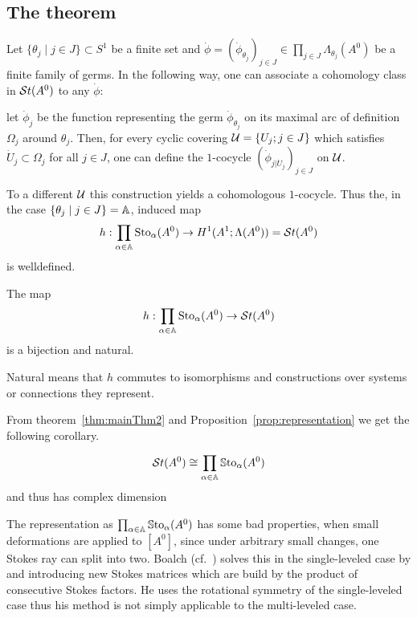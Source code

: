 \subsection{The theorem}
\begin{comment}
  \cite[Thm.6.3.1]{sibuya1990Linear} says: if two differential equations have
  the same stokes phenomenon, they are analytically equivalent.
\end{comment}
Let $\{\theta_j\mid j\in J\}\subset S^1$ be a finite set and
$\dot\phi=(\dot\phi_{\theta_j})_{j\in J}
\in\prod_{j\in J}\Lambda_{\theta_j}(A^0)$ be a finite family of germs.
In the following way, one can associate a cohomology class in $\mathcal{S}{}t(A^0)$ to any
$\dot\phi$:
\begin{einr}
  let $\dot\phi_j$ be the function representing the germ
  $\dot\phi_{\theta_j}$ on its maximal arc of definition $\Omega_j$ around
  $\theta_j$.
  Then, for every cyclic covering $\mathcal{U}=\{U_j;j\in J\}$ which satisfies
  $\dot U_j\subset \Omega_j$ for all $j\in J$, one can define the $1$-cocycle
  $(\dot\phi_{j|\dot U_j})_{j\in J}$ on $\mathcal{U}$.
\end{einr}
To a different $\mathcal{U}$ this construction yields a cohomologous
$1$-cocycle\TODO[Proof]. Thus the, in the case $\{\theta_j\mid j\in J\}=\mathbb{A}$,
induced map
\[
  h:\prod_{\alpha\in\mathbb{A}}\operatorname{Sto}_\alpha(A^0)\to
  H^1(A^1;\Lambda(A^0))=\mathcal{S}{}t(A^0)
\]
is welldefined.
\begin{tthm}
  \label{thm:mainThm2}
  The map
  \[
    h:\prod_{\alpha\in\mathbb{A}}\operatorname{Sto}_\alpha(A^0)\to\mathcal{S}{}t(A^0)
  \]
  is a bijection and natural.
  \begin{s-rem}
    Natural means that $h$ commutes to isomorphisms and constructions over
    systems or connections they represent.
    \begin{comment}
      See \cite{Loday1994} Section III.3.3
    \end{comment}
  \end{s-rem}
\end{tthm}
From theorem~\ref{thm:mainThm2} and Proposition~\ref{prop:representation} we
get the following corollary.
\begin{cor}
  \[
    \mathcal{S}{}t(A^0) \cong \prod_{\alpha\in\mathbb{A}}\operatorname{\mathbb{S}to}_\alpha(A^0)
  \]
  and thus has complex dimension \TODO{}
  \begin{s-rem}
    The representation as $\prod_{\alpha\in\mathbb{A}}\operatorname{\mathbb{S}to}_\alpha(A^0)$ has some bad
    properties, when small deformations are applied to $[A^0]$, since under
    arbitrary small changes, one Stokes ray can split into two. Boalch
    (cf.~\cite{boalch,thboalch}) solves this in the single-leveled case by
     and introducing new
    Stokes matrices which are build by the product of consecutive Stokes
    factors. He uses the rotational symmetry of the single-leveled case thus
    his method is not simply applicable to the multi-leveled case.
  \end{s-rem}
\end{cor}

